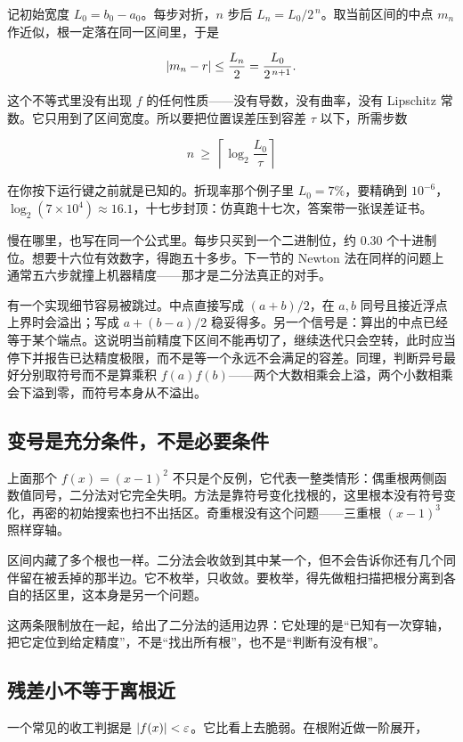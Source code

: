记初始宽度 \(L_0=b_0-a_0\)。每步对折，\(n\) 步后 \(L_n=L_0/2^{\,n}\)。取当前区间的中点 \(m_n\) 作近似，根一定落在同一区间里，于是

\[
\left|m_n-r\right|\le\frac{L_n}{2}=\frac{L_0}{2^{\,n+1}}.
\]

这个不等式里没有出现 \(f\) 的任何性质——没有导数，没有曲率，没有 Lipschitz 常数。它只用到了区间宽度。所以要把位置误差压到容差 \(\tau\) 以下，所需步数

\[
n\ \ge\ \left\lceil\log_2\frac{L_0}{\tau}\right\rceil
\]

在你按下运行键之前就是已知的。折现率那个例子里 \(L_0=7\%\)，要精确到 \(10^{-6}\)，\(\log_2(7\times10^{4})\approx 16.1\)，十七步封顶：仿真跑十七次，答案带一张误差证书。

慢在哪里，也写在同一个公式里。每步只买到一个二进制位，约 \(0.30\) 个十进制位。想要十六位有效数字，得跑五十多步。下一节的 Newton 法在同样的问题上通常五六步就撞上机器精度——那才是二分法真正的对手。

有一个实现细节容易被跳过。中点直接写成 \((a+b)/2\)，在 \(a,b\) 同号且接近浮点上界时会溢出；写成 \(a+(b-a)/2\) 稳妥得多。另一个信号是：算出的中点已经等于某个端点。这说明当前精度下区间不能再切了，继续迭代只会空转，此时应当停下并报告已达精度极限，而不是等一个永远不会满足的容差。同理，判断异号最好分别取符号而不是算乘积 \(f(a)f(b)\)——两个大数相乘会上溢，两个小数相乘会下溢到零，而符号本身从不溢出。

\subsection{变号是充分条件，不是必要条件}

上面那个 \(f(x)=(x-1)^2\) 不只是个反例，它代表一整类情形：偶重根两侧函数值同号，二分法对它完全失明。方法是靠符号变化找根的，这里根本没有符号变化，再密的初始搜索也扫不出括区。奇重根没有这个问题——三重根 \((x-1)^3\) 照样穿轴。

区间内藏了多个根也一样。二分法会收敛到其中某一个，但不会告诉你还有几个同伴留在被丢掉的那半边。它不枚举，只收敛。要枚举，得先做粗扫描把根分离到各自的括区里，这本身是另一个问题。

这两条限制放在一起，给出了二分法的适用边界：它处理的是``已知有一次穿轴，把它定位到给定精度''，不是``找出所有根''，也不是``判断有没有根''。

\subsection{残差小不等于离根近}

一个常见的收工判据是 \(\left|f(x)\right|<\varepsilon\)。它比看上去脆弱。在根附近做一阶展开，

